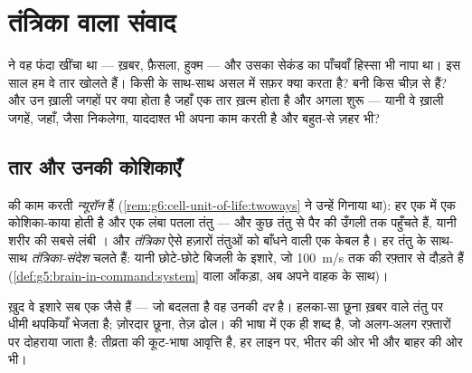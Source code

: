 \chapter{तंत्रिका वाला संवाद}\label{ch:g8:nervous-communication}

 ने वह फंदा खींचा था --- ख़बर, फ़ैसला,
हुक्म --- और उसका सेकंड का पाँचवाँ हिस्सा भी नापा था। इस साल हम वे तार
खोलते हैं। किसी  के साथ-साथ असल में सफ़र क्या करता है?
 बनी किस चीज़ से हैं? और उन ख़ाली जगहों पर क्या होता है जहाँ एक
तार ख़त्म होता है और अगला शुरू --- यानी वे ख़ाली जगहें, जहाँ, जैसा
निकलेगा, याददाश्त भी अपना काम करती है और बहुत-से ज़हर भी?

\section{तार और उनकी कोशिकाएँ}

\begin{definition}[न्यूरॉन और तंत्रिका-संदेश]\label{def:g8:nervous-communication:neuron}
 की काम करती  \emph{न्यूरॉन} हैं
(\cref{rem:g6:cell-unit-of-life:twoways} ने उन्हें गिनाया था): हर एक
में एक कोशिका-काया होती है और एक लंबा पतला तंतु --- और कुछ तंतु  से
पैर की उँगली तक पहुँचते हैं, यानी शरीर की सबसे लंबी । और
\emph{तंत्रिका} ऐसे हज़ारों तंतुओं को बाँधने वाली एक
केबल है। हर तंतु के साथ-साथ \emph{तंत्रिका-संदेश}
चलते हैं: यानी छोटे-छोटे बिजली के इशारे, जो \qty{100}{m/s} तक की
रफ़्तार से दौड़ते हैं (\cref{def:g5:brain-in-command:system} वाला आँकड़ा,
अब अपने वाहक के साथ)।
\end{definition}

\begin{proposition}[आवृत्ति से कूट-भाषा]\label{prop:g8:nervous-communication:code}
ख़ुद वे इशारे सब एक जैसे हैं --- जो बदलता है वह उनकी \emph{दर} है।
हलका-सा छूना ख़बर वाले तंतु पर धीमी थपकियाँ भेजता है; ज़ोरदार छूना, तेज़
ढोल।  की भाषा में एक ही शब्द है, जो अलग-अलग रफ़्तारों पर
दोहराया जाता है: तीव्रता की कूट-भाषा आवृत्ति है, हर लाइन पर, भीतर की ओर
भी और बाहर की ओर भी।
\end{proposition}
\admitted

